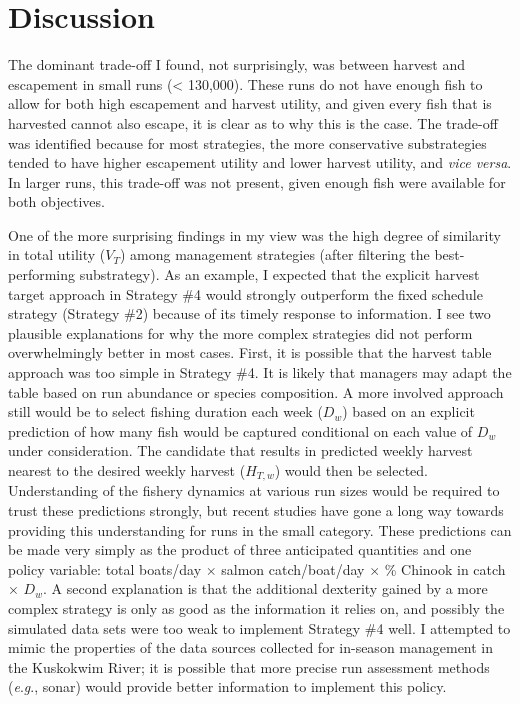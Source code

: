 \documentclass[12pt,]{book}
\theoremstyle{definition}
\theoremstyle{definition}
\theoremstyle{definition}
\theoremstyle{remark}
\begin{document}
\section{Discussion}\label{discussion-1}

\noindent
The dominant trade-off I found, not surprisingly, was between harvest
and escapement in small runs (\textless{} 130,000). These runs do not
have enough fish to allow for both high escapement and harvest utility,
and given every fish that is harvested cannot also escape, it is clear
as to why this is the case. The trade-off was identified because for
most strategies, the more conservative substrategies tended to have
higher escapement utility and lower harvest utility, and \emph{vice
versa}. In larger runs, this trade-off was not present, given enough
fish were available for both objectives.

One of the more surprising findings in my view was the high degree of
similarity in total utility (\(V_T\)) among management strategies (after
filtering the best-performing substrategy). As an example, I expected
that the explicit harvest target approach in Strategy \#4 would strongly
outperform the fixed schedule strategy (Strategy \#2) because of its
timely response to information. I see two plausible explanations for why
the more complex strategies did not perform overwhelmingly better in
most cases. First, it is possible that the harvest table approach was
too simple in Strategy \#4. It is likely that managers may adapt the
table based on run abundance or species composition. A more involved
approach still would be to select fishing duration each week (\(D_w\))
based on an explicit prediction of how many fish would be captured
conditional on each value of \(D_w\) under consideration. The candidate
that results in predicted weekly harvest nearest to the desired weekly
harvest (\(H_{T,w}\)) would then be selected. Understanding of the
fishery dynamics at various run sizes would be required to trust these
predictions strongly, but recent studies
\citep{staton-coggins-2016, staton-coggins-2017, staton-2018} have gone
a long way towards providing this understanding for runs in the small
category. These predictions can be made very simply as the product of
three anticipated quantities and one policy variable: total boats/day
\(\times\) salmon catch/boat/day \(\times\) \% Chinook in catch
\(\times\) \(D_w\). A second explanation is that the additional
dexterity gained by a more complex strategy is only as good as the
information it relies on, and possibly the simulated data sets were too
weak to implement Strategy \#4 well. I attempted to mimic the properties
of the data sources collected for in-season management in the Kuskokwim
River; it is possible that more precise run assessment methods
(\emph{e}.\emph{g}., sonar) would provide better information to
implement this policy.
\end{document}
